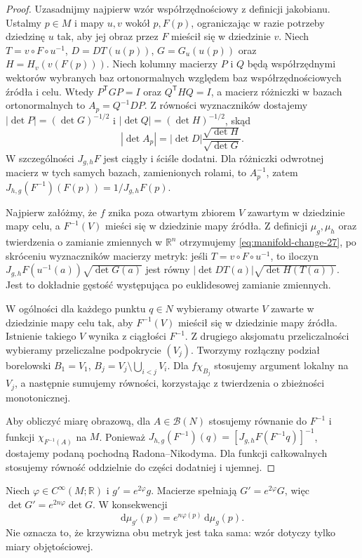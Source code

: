 \begin{proof}
Uzasadnijmy najpierw wzór współrzędnościowy z definicji
jakobianu. Ustalmy $p\in M$ i mapy $u,v$ wokół $p,F(p)$,
ograniczając w razie potrzeby dziedzinę $u$ tak, aby jej obraz
przez $F$ mieścił się w dziedzinie $v$.
Niech $T=v\circ F\circ u^{-1}$, $D=DT(u(p))$,
$G=G_u(u(p))$ oraz $H=H_v(v(F(p)))$.
Niech kolumny macierzy $P$ i $Q$ będą współrzędnymi
wektorów wybranych baz ortonormalnych względem baz
współrzędnościowych źródła i celu. Wtedy
$P^{\mathsf T}GP=I$ oraz $Q^{\mathsf T}HQ=I$, a macierz
różniczki w bazach ortonormalnych to $A_p=Q^{-1}DP$.
Z równości wyznaczników dostajemy
$|\det P|=(\det G)^{-1/2}$ i
$|\det Q|=(\det H)^{-1/2}$, skąd
\[
 |\det A_p|=|\det D|\frac{\sqrt{\det H}}{\sqrt{\det G}}.
\]
W szczególności $J_{g,h}F$ jest ciągły i ściśle dodatni.
Dla różniczki odwrotnej macierz w tych samych bazach,
zamienionych rolami, to $A_p^{-1}$, zatem
$J_{h,g}(F^{-1})(F(p))=1/J_{g,h}F(p)$.

Najpierw załóżmy, że $f$ znika poza otwartym zbiorem $V$
zawartym w dziedzinie mapy celu, a $F^{-1}(V)$
mieści się w dziedzinie mapy źródła. Z definicji
$\mu_g,\mu_h$ oraz twierdzenia o zamianie
zmiennych w $\mathbb R^n$ otrzymujemy
\eqref{eq:manifold-change-27}, po skróceniu
wyznaczników macierzy metryk: jeśli $T=v\circ F\circ u^{-1}$,
to iloczyn $J_{g,h}F(u^{-1}(a))\sqrt{\det G(a)}$
jest równy $|\det DT(a)|\sqrt{\det H(T(a))}$.
Jest to dokładnie gęstość występująca po euklidesowej zamianie zmiennych.

W ogólności dla każdego punktu $q\in N$ wybieramy otwarte
$V$ zawarte w dziedzinie mapy celu tak, aby $F^{-1}(V)$
mieścił się w dziedzinie mapy źródła. Istnienie takiego $V$
wynika z ciągłości $F^{-1}$. Z drugiego aksjomatu przeliczalności
wybieramy przeliczalne podpokrycie $(V_j)$. Tworzymy rozłączny
podział borelowski $B_1=V_1$, $B_j=V_j\setminus\bigcup_{i<j}V_i$.
Dla $f\chi_{B_j}$ stosujemy argument lokalny na $V_j$,
a następnie sumujemy równości, korzystając z twierdzenia
o zbieżności monotonicznej.

Aby obliczyć miarę obrazową, dla $A\in\mathcal B(N)$
stosujemy równanie do $F^{-1}$ i funkcji $\chi_{F^{-1}(A)}$ na $M$.
Ponieważ
$J_{h,g}(F^{-1})(q)=[J_{g,h}F(F^{-1}q)]^{-1}$,
dostajemy podaną pochodną Radona--Nikodyma.
Dla funkcji całkowalnych stosujemy równość
oddzielnie do części dodatniej i ujemnej.
\end{proof}

\begin{przyklad}
Niech $\varphi\in C^\infty(M;\mathbb R)$ i
$g'=e^{2\varphi}g$. Macierze spełniają
$G'=e^{2\varphi}G$, więc
$\det G'=e^{2n\varphi}\det G$. W konsekwencji
\[
 \mathrm d\mu_{g'}(p)=e^{n\varphi(p)}\,\mathrm d\mu_g(p).
\]
Nie oznacza to, że krzywizna obu metryk jest
taka sama: wzór dotyczy tylko miary objętościowej.
\end{przyklad}

